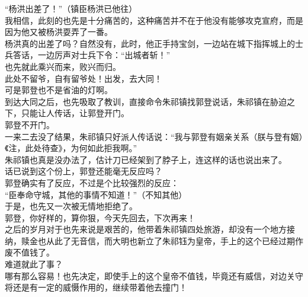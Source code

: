 \begin{multicols}{\theparacolNo}
“杨洪出差了！”（镇臣杨洪已他往）\\

我相信，此刻的也先是十分痛苦的，这种痛苦并不在于他没有能够攻克宣府，而是因为他又被杨洪耍弄了一番。\\

杨洪真的出差了吗？自然没有，此时，他正手持宝剑，一边站在城下指挥城上的士兵答话，一边厉声对士兵下令：“出城者斩！”\\

也先就此乘兴而来，败兴而归。\\

此处不留爷，自有留爷处！出发，去大同！\\

可是郭登也不是省油的灯啊。\\

到达大同之后，也先吸取了教训，直接命令朱祁镇找郭登说话，朱祁镇在胁迫之下，只能让人传话，让郭登开门。\\

郭登不开门。\\

一来二去没了结果，朱祁镇只好派人传话说：“我与郭登有姻亲关系（朕与登有姻）《注，此处待查》，为何如此拒我啊。”\\

朱祁镇也真是没办法了，估计刀已经架到了脖子上，连这样的话也说出来了。\\

话已说到这个份上，郭登还能毫无反应吗？\\

郭登确实有了反应，不过是个比较强烈的反应：\\

“臣奉命守城，其他的事情不知道！”（不知其他）\\

于是，也先又一次被无情地拒绝了。\\

郭登，你好样的，算你狠，今天先回去，下次再来！\\

之后的岁月对于也先来说是艰苦的，他带着朱祁镇四处旅游，却没有一个地方接纳，赎金也从此了无音信，而大明也新立了朱祁钰为皇帝，手上的这个已经过期作废不值钱了。\\

难道就此了事？\\

哪有那么容易！也先决定，即使手上的这个皇帝不值钱，毕竟还有威信，对边关守将还是有一定的威慑作用的，继续带着他去撞门！\\


\end{multicols}
